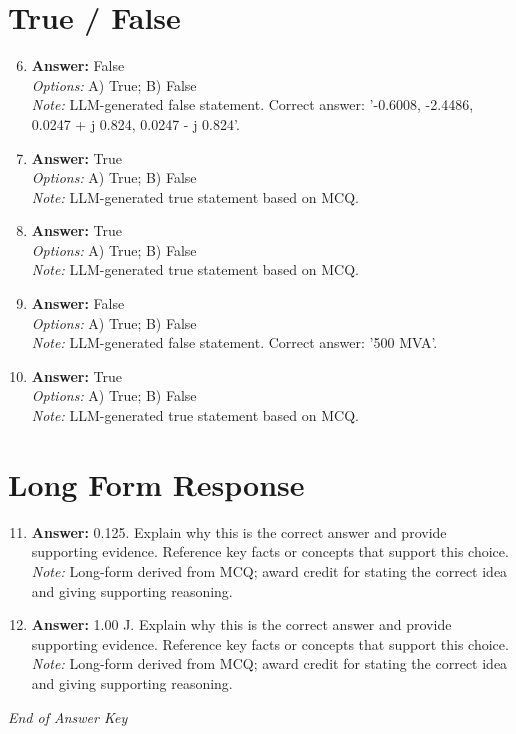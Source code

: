 \documentclass[12pt]{article}
\begin{document}
\section*{True / False}
\begin{enumerate}[label=\arabic*.]
\setcounter{enumi}{5}
\item \textbf{Answer:} False
\\ \textit{Options:} A) True; B) False
\\ \textit{Note:} LLM-generated false statement. Correct answer: '-0.6008, -2.4486, 0.0247 + j 0.824, 0.0247 - j 0.824'.
\item \textbf{Answer:} True
\\ \textit{Options:} A) True; B) False
\\ \textit{Note:} LLM-generated true statement based on MCQ.
\item \textbf{Answer:} True
\\ \textit{Options:} A) True; B) False
\\ \textit{Note:} LLM-generated true statement based on MCQ.
\item \textbf{Answer:} False
\\ \textit{Options:} A) True; B) False
\\ \textit{Note:} LLM-generated false statement. Correct answer: '500 MVA'.
\item \textbf{Answer:} True
\\ \textit{Options:} A) True; B) False
\\ \textit{Note:} LLM-generated true statement based on MCQ.
\end{enumerate}

\section*{Long Form Response}
\begin{enumerate}[label=\arabic*.]
\setcounter{enumi}{10}
\item \textbf{Answer:} 0.125. Explain why this is the correct answer and provide supporting evidence. Reference key facts or concepts that support this choice.
\\ \textit{Note:} Long-form derived from MCQ; award credit for stating the correct idea and giving supporting reasoning.
\item \textbf{Answer:} 1.00 J. Explain why this is the correct answer and provide supporting evidence. Reference key facts or concepts that support this choice.
\\ \textit{Note:} Long-form derived from MCQ; award credit for stating the correct idea and giving supporting reasoning.
\end{enumerate}

\vfill
\noindent\textit{End of Answer Key}
\end{document}
